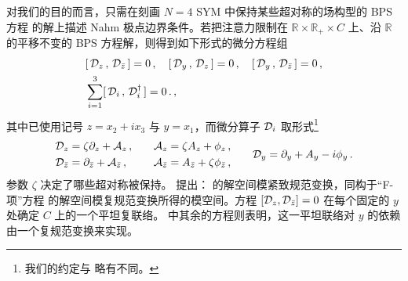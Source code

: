 对我们的目的而言，只需在刻画 $N=4$ SYM 中保持某些超对称的场构型的 BPS 方程 \cite{KW} 的解上描述 Nahm 极点边界条件。若把注意力限制在 $\mathbb{R}\times \mathbb{R}_+ \times C$ 上、沿 $\mathbb{R}$ 的平移不变的 BPS 方程解，则得到如下形式的微分方程组
\begin{subequations}\label{BPS}
\begin{align}
&[\,\mathcal{D}_z\,,\,\mathcal{D}_{\bar{z}}\,]=0\,,\quad [\,\mathcal{D}_y\,,\,\mathcal{D}_{{z}}\,]=0\,,
\quad [\,\mathcal{D}_y\,,\,\mathcal{D}_{\bar{z}}\,]=0\,,\label{Fterm}\\
&\sum_{i=1}^3[\,\mathcal{D}_i\,,\,\mathcal{D}_i^\dagger\,]=0\,. \label{Dterm}\,,
\end{align}
\end{subequations}
其中已使用记号 $z=x_2+ix_3$ 与 $y=x_1$，而微分算子 $\mathcal{D}_i$ 取形式\footnote{我们的约定与 \cite{GW} 略有不同。}
\begin{equation}
\begin{aligned}
&\mathcal{D}_z=\zeta\partial_z+\mathcal{A}_z\,,\\
&\mathcal{D}_{\bar{z}}=\partial_{\bar{z}}+\mathcal{A}_{\bar{z}}\,,
\end{aligned}
\qquad
\begin{aligned}
&\mathcal{A}_z=\zeta A_z+\phi_z\,,\\
&\mathcal{A}_{\bar{z}}=A_{\bar{z}}+\zeta\phi_{\bar{z}}\,,
\end{aligned}
\qquad \mathcal{D}_y=\partial_{y}+A_y-i\phi_y\,.
\end{equation}
参数 $\zeta$ 决定了哪些超对称被保持。\cite{GW} 提出： 的解空间模紧致规范变换，同构于“F-项”方程  的解空间模复规范变换所得的模空间。方程 $[\mathcal{D}_z,\mathcal{D}_{\bar{z}}]=0$ 在每个固定的 $y$ 处确定 $C$ 上的一个平坦复联络。 中其余的方程则表明，这一平坦联络对 $y$ 的依赖由一个复规范变换来实现。

